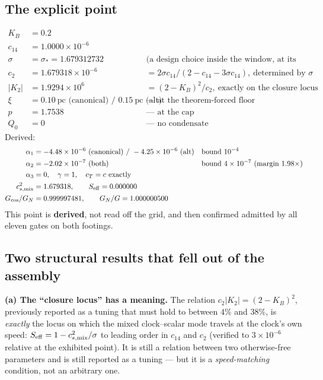 \documentclass[11pt,letterpaper]{article}
\begin{document}
\subsection*{The explicit point}
\begin{align*}
K_B &= 0.2\\
c_{14} &= 1.0000\times10^{-6}\\
\sigma &= \sigma_*=1.679312732 &&\text{(a design choice inside the window, at its lower edge)}\\
c_2 &= 1.679318\times10^{-6} &&= 2\sigma c_{14}/(2-c_{14}-3\sigma c_{14}),\ \text{determined by }\sigma\\
|K_2| &= 1.9294\times10^{6} &&= (2-K_B)^2/c_2,\ \text{exactly on the closure locus}\\
\xi &= 0.10\ \text{pc (canonical) / }0.15\ \text{pc (alt)} &&\text{--- at the theorem-forced floor}\\
p &= 1.7538 &&\text{--- at the cap}\\
Q_0 &= 0 &&\text{--- no condensate}
\end{align*}
Derived:
\begin{align*}
\alpha_1 &= -4.48\times10^{-6}\ \text{(canonical) / }-4.25\times10^{-6}\ \text{(alt)} &&\text{bound }10^{-4}\\
\alpha_2 &= -2.02\times10^{-7}\ \text{(both)} &&\text{bound }4\times10^{-7}\ (\text{margin }1.98\times)\\
\alpha_3 &= 0,\quad \gamma=1,\quad c_T=c\ \text{exactly}\\
c_{s,\rm mix}^2 &= 1.679318,\qquad S_{\rm eff}=0.000000\\
G_{\rm cos}/G_N &= 0.999997481,\qquad G_N/G=1.000000500
\end{align*}
This point is \textbf{derived}, not read off the grid, and then confirmed admitted by all eleven gates on both footings.

\subsection*{Two structural results that fell out of the assembly}
\textbf{(a) The ``closure locus'' has a meaning.} The relation $c_2|K_2|=(2-K_B)^2$, previously reported as a tuning that must hold to between $4\%$ and $38\%$, is \emph{exactly} the locus on which the mixed clock--scalar mode travels at the clock's own speed: $S_{\rm eff}=1-c_{s,\rm mix}^2/\sigma$ to leading order in $c_{14}$ and $c_2$ (verified to $3\times10^{-6}$ relative at the exhibited point). It is still a relation between two otherwise-free parameters and is still reported as a tuning --- but it is a \emph{speed-matching} condition, not an arbitrary one.
\end{document}
